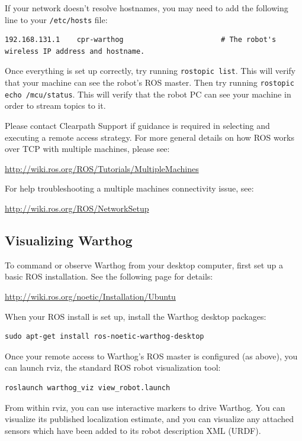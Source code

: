 \documentclass[]{clearpath-latex/clearpath-manual}
\begin{document}
If your network doesn't resolve hostnames, you may need to add the following line to your \lstinline{/etc/hosts} file:

\begin{lstlisting}
192.168.131.1    cpr-warthog                       # The robot's wireless IP address and hostname.
\end{lstlisting}

Once everything is set up correctly, try running \lstinline{rostopic list}. This will verify that your machine can see the robot's ROS master. Then try running \lstinline{rostopic echo /mcu/status}. This will verify that the robot PC can see your machine in order to stream topics to it.

Please contact Clearpath Support if guidance is required in selecting and executing a remote access strategy.
For more general details on how ROS works over TCP with multiple machines, please see:

\url{http://wiki.ros.org/ROS/Tutorials/MultipleMachines}

For help troubleshooting a multiple machines connectivity issue, see:

\url{http://wiki.ros.org/ROS/NetworkSetup}

\subsection{Visualizing Warthog}

To command or observe Warthog from your desktop computer, first set up a basic ROS installation.  See the following page for details:

\url{http://wiki.ros.org/noetic/Installation/Ubuntu}

When your ROS install is set up, install the Warthog desktop packages:

\begin{lstlisting}
sudo apt-get install ros-noetic-warthog-desktop
\end{lstlisting}

Once your remote access to Warthog's ROS master is configured (as above), you can launch rviz, the standard ROS robot visualization tool:

\begin{lstlisting}
roslaunch warthog_viz view_robot.launch
\end{lstlisting}

From within rviz, you can use interactive markers to drive Warthog. You can visualize its published localization estimate, and you can visualize any attached sensors which have been added to its robot description XML (URDF).
\end{document}
